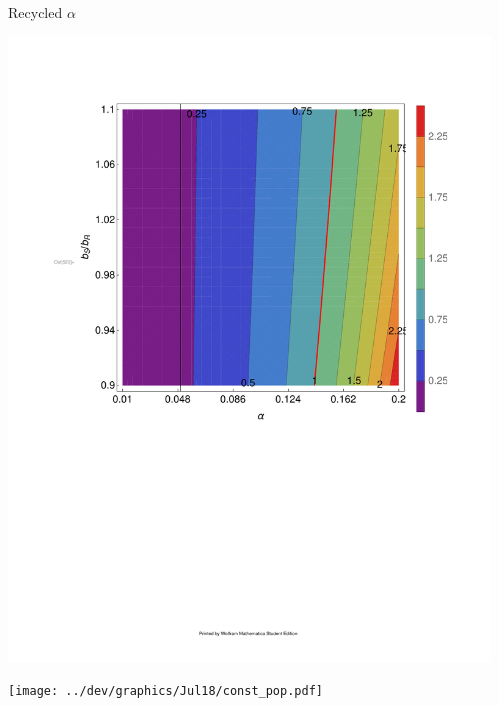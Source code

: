 \documentclass[final]{beamer}
\newlength{\sepwid}
\newlength{\onecolwid}
\begin{document}
\begin{frame}[t]
\begin{block}
\begin{columns}[t]
\begin{column}{\onecolwid}
  \begin{alertblock}{Recycled $\alpha$}
    \begin{center}
      \includegraphics[width=\columnwidth]{../dev/graphics/Jul14/const_alpha_contour.pdf}

      \texttt{[image: ../dev/graphics/Jul18/const\_pop.pdf]}
    \end{center}
  \end{alertblock}
\end{column}

\begin{column}{\sepwid}\end{column} %

\end{columns} %
\end{block}



\end{frame}
\end{document}
